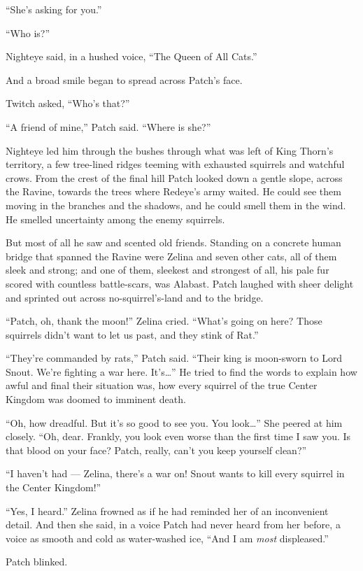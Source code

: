 \documentclass[ebook,oneside,openany,12pt]{memoir}
\begin{document}
“She’s asking for you.”

“Who is?”

Nighteye said, in a hushed voice, “The Queen of All Cats.”

And a broad smile began to spread across Patch’s face.

Twitch asked, “Who’s that?”

“A friend of mine,” Patch said. “Where is she?”

Nighteye led him through the bushes through what was left of King
Thorn’s territory, a few tree-lined ridges teeming with exhausted
squirrels and watchful crows. From the crest of the final hill Patch
looked down a gentle slope, across the Ravine, towards the trees where
Redeye’s army waited. He could see them moving in the branches and the
shadows, and he could smell them in the wind. He smelled uncertainty
among the enemy squirrels.

But most of all he saw and scented old friends. Standing on a concrete
human bridge that spanned the Ravine were Zelina and seven other cats,
all of them sleek and strong; and one of them, sleekest and strongest
of all, his pale fur scored with countless battle-scars, was
Alabast. Patch laughed with sheer delight and sprinted out across
no-squirrel’s-land and to the bridge.

“Patch, oh, thank the moon!” Zelina cried. “What’s going on here?
Those squirrels didn’t want to let us past, and they stink of Rat.”

“They’re commanded by rats,” Patch said. “Their king is moon-sworn to
Lord Snout. We’re fighting a war here. It’s…” He tried to find the
words to explain how awful and final their situation was, how every
squirrel of the true Center Kingdom was doomed to imminent death.

“Oh, how dreadful. But it’s so good to see you. You look…” She peered
at him closely. “Oh, dear. Frankly, you look even worse than the first
time I saw you. Is that blood on your face? Patch, really, can’t you
keep yourself clean?”

“I haven’t had — Zelina, there’s a war on! Snout wants to kill every
squirrel in the Center Kingdom!”

“Yes, I heard.” Zelina frowned as if he had reminded her of an
inconvenient detail. And then she said, in a voice Patch had never
heard from her before, a voice as smooth and cold as water-washed ice,
“And I am \emph{most} displeased.”

Patch blinked.
\end{document}
